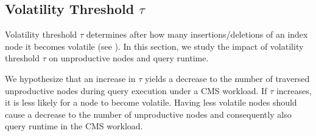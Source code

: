 \documentclass[abstracton,12pt]{scrartcl}
\theoremstyle{definition}
\begin{document}




\subsection{Volatility Threshold $\tau$}

\label{sec:threshold}

Volatility threshold $\tau$ determines after how many insertions/deletions of an index node
it becomes volatile (see ). In this section, we study the impact of
volatility threshold $\tau$ on unproductive nodes and query runtime.

We hypothesize that an increase in $\tau$ yields a decrease to the number of
traversed unproductive nodes during query execution under a CMS workload. If
$\tau$ increases, it is
less likely for a node to become volatile. Having less volatile nodes should
cause a decrease to the number of unproductive nodes and consequently also query
runtime in the CMS workload.

\end{document}
